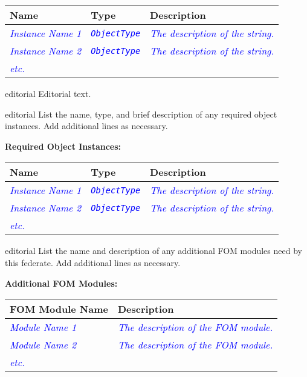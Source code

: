 \documentclass[11pt,english,letterpaper]{article}
\newcommand{\example}[1]{{\textcolor{blue}{\textit{#1}}}}
\begin{document}
\begin{tabularx}{\textwidth}{|l|l|X|} \hline
Name & Type & Description \\ \hline
\example{Instance Name 1} & \example{\texttt{ObjectType}} &
\example{The description of the string.} \\ \hline
\example{Instance Name 2} & \example{\texttt{ObjectType}} &
\example{The description of the string.} \\ \hline
\example{etc.} & \\ \hline
\end{tabularx}




\begin{shownto}{editorial}
{\color{red} Editorial text.}
\end{shownto}

\begin{shownto}{editorial}
{\color{red} List the name, type, and brief description of any required
object instances. Add additional lines as necessary.}
\end{shownto}

\textbf{Required Object Instances: }

\begin{tabularx}{\textwidth}{|l|l|X|} \hline
Name & Type & Description \\ \hline
\example{Instance Name 1} & \example{\texttt{ObjectType}} &
\example{The description of the string.} \\ \hline
\example{Instance Name 2} & \example{\texttt{ObjectType}} &
\example{The description of the string.} \\ \hline
\example{etc.} & \\ \hline
\end{tabularx}

\begin{shownto}{editorial}
{\color{red}List the name and description of any additional FOM modules need by
this federate. Add additional lines as necessary.}
\end{shownto}

\textbf{Additional FOM Modules: }

\begin{tabularx}{\textwidth}{|l|X|} \hline
FOM Module Name & Description \\ \hline
\example{Module Name 1} & \example{The description of the FOM module.} \\ \hline
\example{Module Name 2} & \example{The description of the FOM module.} \\ \hline
\example{etc.} &  \\ \hline
\end{tabularx}
\end{document}
